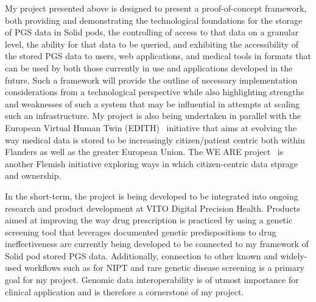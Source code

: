 \documentclass[a4paper,11pt]{article}
\begin{document}
\begin{refsection}
My project presented above is designed to present a proof-of-concept framework, both providing and demonstrating the technological foundations for the storage of PGS data in Solid pods, the controlling of access to that data on a granular level, the ability for that data to be queried, and exhibiting the accessibility of the stored PGS data to users, web applications, and medical tools in formats that can be used by both those currently in use and applications developed in the future. 
Such a framework will provide the outline of necessary implementation considerations from a technological perspective while also highlighting strengths and weaknesses of such a system that may be influential in attempts at scaling such an infrastructure. 
My project is also being undertaken in parallel with the European Virtual Human Twin (EDITH)~\cite{edith} initiative that aims at evolving the way medical data is stored to be increasingly citizen/patient centric both within Flanders as well as the greater European Union. 
The WE ARE project~\cite{weare} is another Flemish initiative exploring ways in which citizen-centric data stprage and ownership.


In the short-term, the project is being developed to be integrated into ongoing research and product development at VITO Digital Precision Health. 
Products aimed at improving the way drug prescription is practiced by using a genetic screening tool that leverages documented genetic predispositions to drug ineffectiveness are currently being developed to be connected to my framework of Solid pod stored PGS data. 
Additionally, connection to other known and widely-used workflows such as for NIPT and rare genetic disease screening is a primary goal for my project. 
Genomic data interoperability is of utmost importance for clinical application and is therefore a cornerstone of my project. 


\end{refsection}
\end{document}
